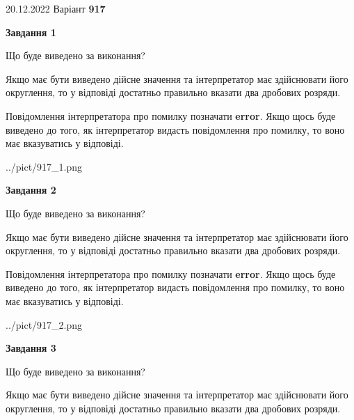\documentclass[12pt, ukrainian]{article}
\begin{document}
{20.12.2022 Варіант \No \textbf { 917 }\par}
{
\begin {Large}

{\begin {center}\textbf{Завдання 1}\end {center}}\par
Що буде виведено за виконання? \par

Якщо має бути виведено дійсне значення та інтерпретатор має здійснювати його округлення, 
то у відповіді достатньо правильно вказати два дробових розряди.

Повідомлення інтерпретатора про помилку позначати \textbf{error}.
Якщо щось буде виведено до того, як інтерпретатор видасть повідомлення про помилку, 
то воно має вказуватись у відповіді. \par

\begin{center}
	{../pict/917_1.png}
\end{center}
\newpage

{\begin {center}\textbf{Завдання 2}\end {center}}\par
Що буде виведено за виконання? \par

Якщо має бути виведено дійсне значення та інтерпретатор має здійснювати його округлення, 
то у відповіді достатньо правильно вказати два дробових розряди.

Повідомлення інтерпретатора про помилку позначати \textbf{error}.
Якщо щось буде виведено до того, як інтерпретатор видасть повідомлення про помилку, 
то воно має вказуватись у відповіді. \par

\begin{center}
	{../pict/917_2.png}
\end{center}
\newpage

{\begin {center}\textbf{Завдання 3}\end {center}}\par
Що буде виведено за виконання? \par

Якщо має бути виведено дійсне значення та інтерпретатор має здійснювати його округлення, 
то у відповіді достатньо правильно вказати два дробових розряди.


\end{Large}}
\end{document}
